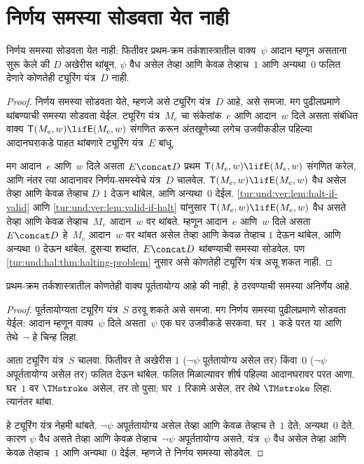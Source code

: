 \section{निर्णय समस्या सोडवता येत नाही}\label{tur:und:uns:sec}

\begin{thm}
\label{tur:und:uns:thm:decision-prob}
निर्णय समस्या सोडवता येत नाही:
फितीवर प्रथम-क्रम तर्कशास्त्रातील
वाक्य~$\psi$ आदान म्हणून
असताना सुरू केले की $D$ अखेरीस थांबून,
$\psi$ वैध असेल तेव्हा आणि केवळ तेव्हाच~$1$ आणि
अन्यथा~$0$ फलित देणारे
कोणतेही ट्यूरिंग यंत्र~$D$ नाही.
\end{thm}

\begin{proof}
निर्णय समस्या सोडवता येते,
म्हणजे असे ट्यूरिंग यंत्र~$D$
आहे, असे समजा. मग पुढीलप्रमाणे
थांबण्याची समस्या सोडवता येईल.
ट्यूरिंग यंत्र~$M_e$ चा संकेतांक~$e$
आणि आदान~$w$ दिले असता
संबंधित वाक्य
$\mathsf{T}(M_e, w) \lif \mathsf{E}(M_e, w)$
संगणित करून अंतखूणेच्या लगेच उजवीकडील
पहिल्या आदानघराकडे पाहत थांबणारे
ट्यूरिंग यंत्र~$E$ बांधू.

मग आदान~$e$ आणि~$w$
दिले असता $E \concat D$
प्रथम $\mathsf{T}(M_e, w) \lif
\mathsf{E}(M_e, w)$ संगणित करेल,
आणि नंतर त्या आदानावर
निर्णय-समस्येचे यंत्र~$D$
चालवेल. $\mathsf{T}(M_e, w) \lif \mathsf{E}(M_e, w)$
वैध असेल तेव्हा आणि केवळ तेव्हाच $D$
$1$ देऊन थांबेल, आणि
अन्यथा~$0$ देईल.
\ref{tur:und:ver:lem:halt-if-valid}
आणि \ref{tur:und:ver:lem:valid-if-halt}
यांनुसार $\mathsf{T}(M_e, w) \lif \mathsf{E}(M_e, w)$
वैध असते तेव्हा आणि केवळ तेव्हाच~$M_e$
आदान~$w$ वर थांबते.
म्हणून आदान~$e$ आणि~$w$
दिले असता $E\concat D$
हे~$M_e$ आदान~$w$
वर थांबत असेल तेव्हा आणि केवळ तेव्हाच
$1$ देऊन थांबेल, आणि
अन्यथा~$0$ देऊन थांबेल.
दुसऱ्या शब्दांत, $E \concat D$
थांबण्याची समस्या सोडवेल.
पण \ref{tur:und:hal:thm:halting-problem}
नुसार असे कोणतेही
ट्यूरिंग यंत्र असू शकत नाही.
\end{proof}

\begin{cor}\label{tur:und:uns:cor:undecidable-sat}
प्रथम-क्रम तर्कशास्त्रातील
कोणतेही वाक्य
पूर्ततायोग्य आहे की नाही,
हे ठरवण्याची समस्या अनिर्णेय आहे.
\end{cor}

\begin{proof}
  पूर्ततायोग्यता ट्यूरिंग यंत्र~$S$
  ठरवू शकते असे समजा. मग
  निर्णय समस्या पुढीलप्रमाणे
  सोडवता येईल: आदान म्हणून
  वाक्य~$\psi$ दिले
  असता~$\psi$ एक घर उजवीकडे
  सरकवा. घर~$1$ कडे परत
  या आणि तेथे~$\lnot$
  हे चिन्ह लिहा.


  आता ट्यूरिंग यंत्र~$S$
  चालवा. फितीवर ते अखेरीस
  $1$ ($\lnot \psi$ पूर्ततायोग्य
  असेल तर) किंवा~$0$
  ($\lnot \psi$ अपूर्ततायोग्य
  असेल तर) फलित देऊन
  थांबेल. फलित मिळाल्यावर शीर्ष पहिल्या
  आदानघरावर परत आणा. घर~$1$ वर
  $\TMstroke$ असेल, तर
  तो पुसा; घर~$1$
  रिकामे असेल, तर तेथे
  $\TMstroke$ लिहा.
  त्यानंतर थांबा.

  हे ट्यूरिंग यंत्र नेहमी
  थांबते. $\lnot
  \psi$ अपूर्ततायोग्य असेल
  तेव्हा आणि केवळ तेव्हाच ते~$1$ देते;
  अन्यथा~$0$ देते.
  कारण $\psi$ वैध असते
  तेव्हा आणि केवळ तेव्हाच~$\lnot \psi$
  अपूर्ततायोग्य असते,
  यंत्र~$\psi$ वैध असेल
  तेव्हा आणि केवळ तेव्हाच~$1$ आणि
  अन्यथा~$0$ देईल.
  म्हणजे ते निर्णय
  समस्या सोडवेल.
\end{proof}

